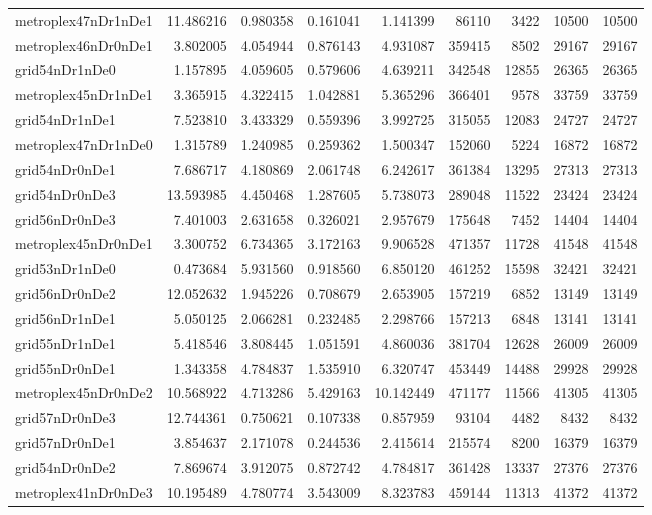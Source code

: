 \begin{longtable}{|l|r|r|r|r|r|r|r|r|}
metroplex47nDr1nDe1 & 11.486216 & 0.980358 & 0.161041 & 1.141399 & 86110 & 3422 & 10500 & 10500 \\
metroplex46nDr0nDe1 & 3.802005 & 4.054944 & 0.876143 & 4.931087 & 359415 & 8502 & 29167 & 29167 \\
grid54nDr1nDe0 & 1.157895 & 4.059605 & 0.579606 & 4.639211 & 342548 & 12855 & 26365 & 26365 \\
metroplex45nDr1nDe1 & 3.365915 & 4.322415 & 1.042881 & 5.365296 & 366401 & 9578 & 33759 & 33759 \\
grid54nDr1nDe1 & 7.523810 & 3.433329 & 0.559396 & 3.992725 & 315055 & 12083 & 24727 & 24727 \\
metroplex47nDr1nDe0 & 1.315789 & 1.240985 & 0.259362 & 1.500347 & 152060 & 5224 & 16872 & 16872 \\
grid54nDr0nDe1 & 7.686717 & 4.180869 & 2.061748 & 6.242617 & 361384 & 13295 & 27313 & 27313 \\
grid54nDr0nDe3 & 13.593985 & 4.450468 & 1.287605 & 5.738073 & 289048 & 11522 & 23424 & 23424 \\
grid56nDr0nDe3 & 7.401003 & 2.631658 & 0.326021 & 2.957679 & 175648 & 7452 & 14404 & 14404 \\
metroplex45nDr0nDe1 & 3.300752 & 6.734365 & 3.172163 & 9.906528 & 471357 & 11728 & 41548 & 41548 \\
grid53nDr1nDe0 & 0.473684 & 5.931560 & 0.918560 & 6.850120 & 461252 & 15598 & 32421 & 32421 \\
grid56nDr0nDe2 & 12.052632 & 1.945226 & 0.708679 & 2.653905 & 157219 & 6852 & 13149 & 13149 \\
grid56nDr1nDe1 & 5.050125 & 2.066281 & 0.232485 & 2.298766 & 157213 & 6848 & 13141 & 13141 \\
grid55nDr1nDe1 & 5.418546 & 3.808445 & 1.051591 & 4.860036 & 381704 & 12628 & 26009 & 26009 \\
grid55nDr0nDe1 & 1.343358 & 4.784837 & 1.535910 & 6.320747 & 453449 & 14488 & 29928 & 29928 \\
metroplex45nDr0nDe2 & 10.568922 & 4.713286 & 5.429163 & 10.142449 & 471177 & 11566 & 41305 & 41305 \\
grid57nDr0nDe3 & 12.744361 & 0.750621 & 0.107338 & 0.857959 & 93104 & 4482 & 8432 & 8432 \\
grid57nDr0nDe1 & 3.854637 & 2.171078 & 0.244536 & 2.415614 & 215574 & 8200 & 16379 & 16379 \\
grid54nDr0nDe2 & 7.869674 & 3.912075 & 0.872742 & 4.784817 & 361428 & 13337 & 27376 & 27376 \\
metroplex41nDr0nDe3 & 10.195489 & 4.780774 & 3.543009 & 8.323783 & 459144 & 11313 & 41372 & 41372 \\

\end{longtable}
